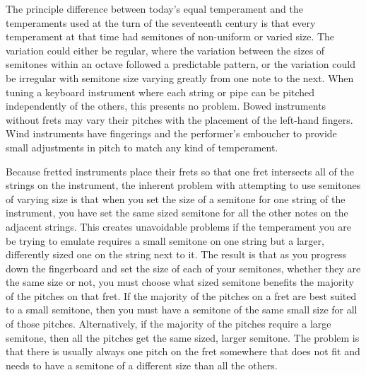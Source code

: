 The principle difference between today's equal temperament and the temperaments used at
the turn of the seventeenth century is that every temperament at that time had
semitones of non-uniform or varied size.  The variation could either be regular, where
the variation between the sizes of semitones within an octave followed a predictable
pattern, or the variation could be irregular with semitone size varying greatly from
one note to the next. When tuning a keyboard instrument where each string or pipe can
be pitched independently of the others, this presents no problem.  Bowed instruments
without frets may vary their pitches with the placement of the left-hand fingers.  Wind
instruments have fingerings and the performer's emboucher to provide small adjustments
in pitch to match any kind of temperament.

Because fretted instruments place their frets so that one fret intersects all of the
strings on the instrument, the inherent problem with attempting to use semitones of
varying size is that when you set the size of a semitone for one string of the
instrument, you have set the same sized semitone for all the other notes on the
adjacent strings. This creates unavoidable problems if the temperament you are be
trying to emulate requires a small semitone on one string but a larger, differently
sized one on the string next to it. The result is that as you progress down the
fingerboard and set the size of each of your semitones, whether they are the same size
or not, you must choose what sized semitone benefits the majority of the pitches on
that fret. \autocite[120]{RD:1} If the majority of the pitches on a fret are best
suited to a small semitone, then you must have a semitone of the same small size for
all of those pitches. Alternatively, if the majority of the pitches require a large
semitone, then all the pitches get the same sized, larger semitone.  The problem is
that there is usually always one pitch on the fret somewhere that does not fit and
needs to have a semitone of a different size than all the others.

